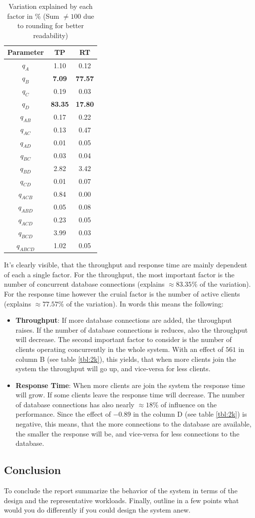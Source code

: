 \documentclass[11pt]{article}
\begin{document}
\begin{table}
\centering
\caption{Variation explained by each factor in \% (Sum $\neq100$ due to rounding for better readability)}
\label{tbl:2k_labels}
\begin{tabular}{ccc}
	Parameter & TP & RT \\ \hline
	$q_{A}$ & 1.10  & 0.12  \\
	$q_{B}$ & \textbf{7.09} & \textbf{77.57}  \\
	$q_{C}$ & 0.19 & 0.03  \\
	$q_{D}$ & \textbf{83.35} & \textbf{17.80} \\
	$q_{AB}$ & 0.17 & 0.22  \\
	$q_{AC}$ & 0.13  & 0.47  \\
	$q_{AD}$ & 0.01  & 0.05  \\
	$q_{BC}$ & 0.03  & 0.04  \\
	$q_{BD}$ & 2.82  & 3.42 \\
	$q_{CD}$ & 0.01  & 0.07  \\
	$q_{ACB}$ & 0.84  & 0.00  \\
	$q_{ABD}$ & 0.05  & 0.08  \\
	$q_{ACD}$ & 0.23  & 0.05  \\
	$q_{BCD}$ & 3.99  & 0.03  \\
	$q_{ABCD}$ & 1.02  & 0.05  \\
\end{tabular}
\end{table}
It's clearly visible, that the throughput and response time are mainly dependent of each a single factor. For the throughput, the most important factor is the number of concurrent database connections (explains $\approx83.35\%$ of the variation). For the response time however the cruial factor is the number of active clients (explains $\approx77.57\%$ of the variation). In words this means the following:
\begin{itemize}
	\item \textbf{Throughput}: If more database connections are added, the throughput raises. If the number of database connections is reduces, also the throughput will decrease. The second important factor to consider is the number of clients operating concurrently in the whole system. With an effect of $561$ in column B (see table \ref{tbl:2k}), this yields, that when more clients join the system the throughput will go up, and vice-versa for less clients.
	\item \textbf{Response Time}: When more clients are join the system the response time will grow. If some clients leave the response time will decrease. The number of database connections has also nearly $\approx18\%$ of influence on the performance. Since the effect of $-0.89$ in the column D (see table \ref{tbl:2k}) is negative, this means, that the more connections to the database are available, the smaller the response will be, and vice-versa for less connections to the database.
\end{itemize}
\subsection{Conclusion}\label{sec:conclusion}

To conclude the report summarize the behavior of the system in terms of
the design and the representative workloads. Finally, outline in a few
points what would you do differently if you could design the system
anew.
\end{document}
